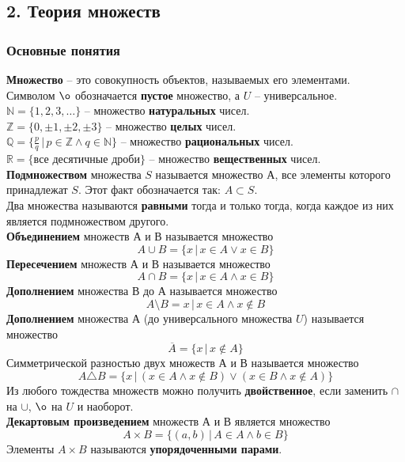 \documentclass[a4paper,12pt]{article}
\theoremstyle{plain}
\theoremstyle{definition}
\theoremstyle{remark}
\newcommand{\nl}{\\ \indent}
\begin{document}

%
\subsection*{2. Теория множеств}
\subsubsection*{Основные понятия}
\indent
\textbf{Множество} -- это совокупность объектов, 
называемых его эле­ментами.
\\ \indent
Символом $\o$ обозначается \textbf{пустое} множество, 
а $U$ -- универсальное. 
\nl
$\mathbb{N} = \{1, 2, 3, \ldots \}$ -- 
множество \textbf{натуральных} чисел.
\nl
$\mathbb{Z}= \{0, \pm 1, \pm 2 , \pm 3 \}$ --
множество \textbf{целых} чисел.
\nl
$\mathbb{Q} = \{ \frac{p}{q} \, | \,
p \in \mathbb{Z} \wedge q \in \mathbb{N}\}$ --
множество \textbf{рациональных} чисел.
\nl
$\mathbb{R} = \{ \text{все десятичные дроби} \}$ --
множество \textbf{вещественных} чисел. 
\nl
\textbf{Подмножеством} 
множества $S$ называется множество $А$, 
все эле­менты которого принадлежат $S$. 
Этот факт обозначается так: $A \subset S$.
\nl
Два множества называются \textbf{равными} 
тогда и только тогда, когда
каждое из них является подмножеством другого.
\nl
\textbf{Объединением} множеств $А$ и $В$ называется множество
\[
A \cup B  = \{ x \, | \, x \in A \vee x \in B \}
\]
\indent
\textbf{Пересечением} множеств $А$ и $В$ называется множество
\[
A \cap B = \{ x \, | \, x \in A \wedge x \in B \}
\]
\indent
\textbf{Дополнением} множества $В$ до $А$ называется множество
\[
A \setminus B = {x \, | \, x \in A \wedge x \not\in B}
\]
\indent
\textbf{Дополнением} множества $А$ 
(до универсального множества $U$) называется множество
\[
\overline{A} =
\{ x \, | \, x \not\in A \}
\]
\indent Симметрической разностью двух множеств 
$А$ и $В$ называется множество
\[
A \triangle B = 
\{
x \, | \, (x \in A \wedge x \not\in B) \vee
(x \in B \wedge x \not\in A)
\}
\]
\indent
Из любого тождества множеств можно получить 
\textbf{двойственное},
если заменить $\cap$ на $\cup$, $\o$ на $U$ и наоборот.
\nl
\textbf{Декартовым произведением} множеств 
$А$ и $В$ является множе­ство
\[
A \times B =
\{ (a, b) \, | \, A \in A \wedge b \in B \}
\]
\indent
Элементы $A \times B$ называются \textbf{упорядоченными парами}.
\nl 
\end{document}

